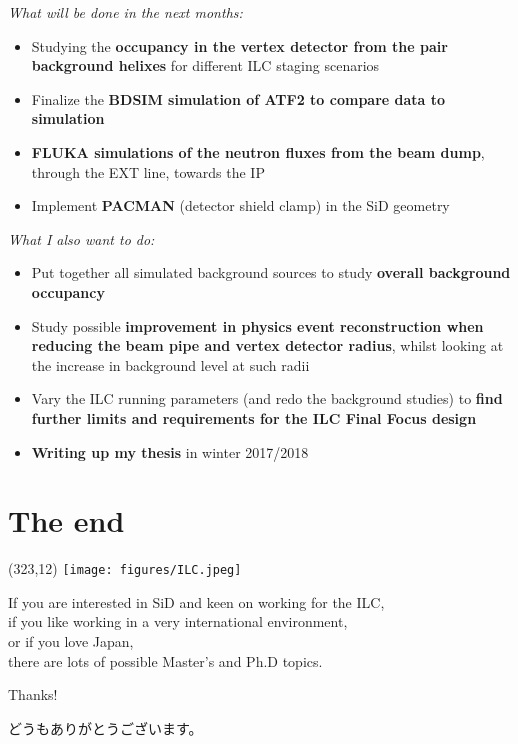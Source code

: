 \documentclass[xcolor={dvipsnames}]{beamer}
\newcommand{\ilclogo}{
  \setlength{\TPHorizModule}{1pt}
  \setlength{\TPVertModule}{1pt}
  \begin{textblock}{1}(323,12)
   \texttt{[image: figures/ILC.jpeg]}
  \end{textblock}
}
\begin{document}
\begin{frame}
\textit{What will be done in the next months:}
 \begin{itemize}
  \item Studying the \textbf{occupancy in the vertex detector from the pair background helixes} for different ILC staging scenarios
  \item Finalize the \textbf{BDSIM simulation of ATF2 to compare data to simulation}
  \item \textbf{FLUKA simulations of the neutron fluxes from the beam dump}, through the EXT line, towards the IP
  \item Implement \textbf{PACMAN} (detector shield clamp) in the SiD geometry
 \end{itemize}
\textit{What I also want to do:}
 \begin{itemize}
  \item Put together all simulated background sources to study \textbf{overall background occupancy}
  \item Study possible \textbf{improvement in physics event reconstruction when reducing the beam pipe and vertex detector radius}, whilst looking at the increase in background level at such radii
  \item Vary the ILC running parameters (and redo the background studies) to \textbf{find further limits and requirements for the ILC Final Focus design}
  \item \textbf{Writing up my thesis} in winter 2017/2018
 \end{itemize}
\end{frame}


\section*{The end}
{
\begin{frame}
\ilclogo
\begin{center}
If you are interested in SiD and keen on working for the ILC, \\
if you like working in a very international environment, \\
or if you love Japan,\\
there are lots of possible Master's and Ph.D topics.\\
\vspace*{1cm}
\textcolor{RubineRed}{
	\LARGE Thanks!\\
	\begin{CJK}{UTF8}{min}
	どうもありがとうございます。
	\end{CJK}
}
\end{center}
\end{frame}
}
\end{document}
